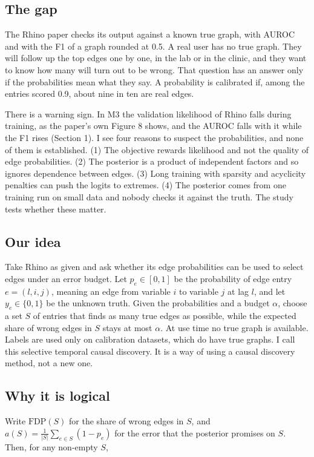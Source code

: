 \documentclass[10pt]{article}
\begin{document}
\subsection{The gap}
The Rhino paper checks its output against a known true graph, with AUROC and with the F1 of a graph rounded at 0.5. A real user has no true graph. They will follow up the top edges one by one, in the lab or in the clinic, and they want to know how many will turn out to be wrong. That question has an answer only if the probabilities mean what they say. A probability is calibrated if, among the entries scored 0.9, about nine in ten are real edges.

There is a warning sign. In M3 the validation likelihood of Rhino falls during training, as the paper's own Figure 8 shows, and the AUROC falls with it while the F1 rises (Section 1). I see four reasons to suspect the probabilities, and none of them is established. (1) The objective rewards likelihood and not the quality of edge probabilities. (2) The posterior is a product of independent factors and so ignores dependence between edges. (3) Long training with sparsity and acyclicity penalties can push the logits to extremes. (4) The posterior comes from one training run on small data and nobody checks it against the truth. The study tests whether these matter.

\subsection{Our idea}
Take Rhino as given and ask whether its edge probabilities can be used to select edges under an error budget. Let $p_e\in[0,1]$ be the probability of edge entry $e=(l,i,j)$, meaning an edge from variable $i$ to variable $j$ at lag $l$, and let $y_e\in\{0,1\}$ be the unknown truth. Given the probabilities and a budget $\alpha$, choose a set $S$ of entries that finds as many true edges as possible, while the expected share of wrong edges in $S$ stays at most $\alpha$. At use time no true graph is available. Labels are used only on calibration datasets, which do have true graphs. I call this selective temporal causal discovery. It is a way of using a causal discovery method, not a new one.

\subsection{Why it is logical}
Write $\mathrm{FDP}(S)$ for the share of wrong edges in $S$, and $a(S)=\frac{1}{|S|}\sum_{e\in S}(1-p_e)$ for the error that the posterior promises on $S$. Then, for any non-empty $S$,
\end{document}
